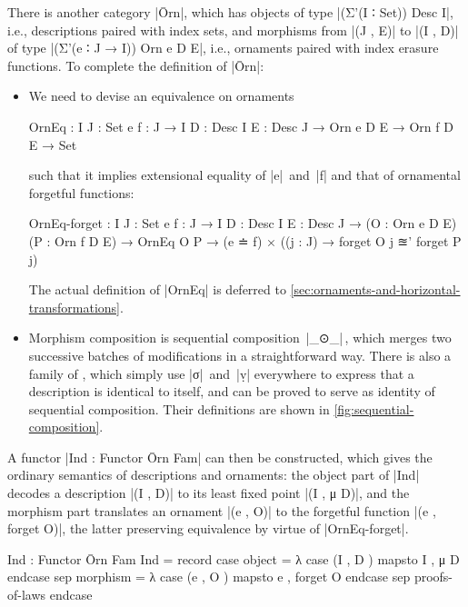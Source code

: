 There is another category |Ōrn|, which has objects of type |(Σ'(I ∶ Set)) Desc I|, i.e., descriptions paired with index sets, and morphisms from |(J , E)| to |(I , D)| of type |(Σ'(e ∶ J → I)) Orn e D E|, i.e., ornaments paired with index erasure functions.
To complete the definition of |Ōrn|:
\begin{itemize}
\item We need to devise an equivalence on ornaments
\begin{code}
OrnEq :  {I J : Set} {e f : J → I} {D : Desc I} {E : Desc J} →
         Orn e D E → Orn f D E → Set
\end{code}
such that it implies extensional equality of |e|~and~|f| and that of ornamental forgetful functions:
\begin{code}
OrnEq-forget :  {I J : Set} {e f : J → I} {D : Desc I} {E : Desc J} →
                (O : Orn e D E) (P : Orn f D E) → OrnEq O P →
                (e ≐ f) × ((j : J) → forget O {j} ≊' forget P {j})
\end{code}
The actual definition of |OrnEq| is deferred to \autoref{sec:ornaments-and-horizontal-transformations}.

\item Morphism composition is sequential composition~|_⊙_|\,, which merges two successive batches of modifications in a straightforward way.
There is also a family of , which simply use |σ|~and~|ṿ| everywhere to express that a description is identical to itself, and can be proved to serve as identity of sequential composition.
Their definitions are shown in \autoref{fig:sequential-composition}.
\end{itemize}

A functor |Ind : Functor Ōrn Fam| can then be constructed, which gives the ordinary semantics of descriptions and ornaments: the object part of |Ind| decodes a description |(I , D)| to its least fixed point |(I , μ D)|, and the morphism part translates an ornament |(e , O)| to the forgetful function |(e , forget O)|, the latter preserving equivalence by virtue of |OrnEq-forget|.
\begin{code}
Ind : Functor Ōrn Fam
Ind = record  case  object    =  λ case (I , D  ) mapsto I , μ D       endcase
              sep   morphism  =  λ case (e , O  ) mapsto e , forget O  endcase
              sep   proofs-of-laws endcase
\end{code}

